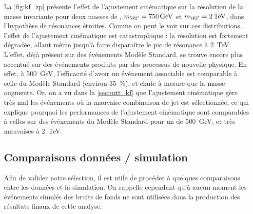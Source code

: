 La \cref{fig:kf_zp} présente l'effet de l'ajustement cinématique sur la résolution de la masse invariante pour deux masses de \zprime, $\mzp = \SI{750}{\GeV}$ et $\mzp = \SI{2}{\TeV}$, dans l'hypothèse de résonances étroites. Comme on peut le voir sur ces distributions, l'effet de l'ajustement cinématique est catastrophique : la résolution est fortement dégradée, allant même jusqu'à faire disparaître le pic de résonance à \SI{2}{\TeV}. L'effet, déjà présent sur des événements \ttbar Modèle Standard, se trouve encore plus accentué sur des événements \ttbar produits par des processus de nouvelle physique. En effet, à \SI{500}{\GeV}, l'efficacité d'avoir un événement associable est comparable à celle du Modèle Standard (environ \SI{35}{\percent}), et chute à mesure que la masse augmente. Or, on a vu dans la \cref{sec:mtt_kf} que l'ajustement cinématique gère très mal les événements où la mauvaise combinaison de jet est sélectionnée, ce qui explique pourquoi les performances de l'ajustement cinématique sont comparables à celles sur des événements \ttbar du Modèle Standard pour un \zprime de \SI{500}{\GeV}, et très mauvaises à \SI{2}{\TeV}.

\subsection{Comparaisons données / simulation}

Afin de valider notre sélection, il est utile de procéder à quelques comparaisons entre les données et la simulation. On rappelle cependant qu'à aucun moment les événements simulés des bruits de fonds ne sont utilisées dans la production des résultats finaux de cette analyse.

\medskip

